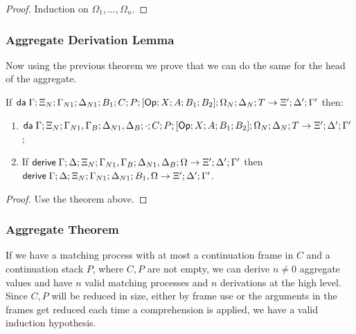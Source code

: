 \begin{proof}
   Induction on $\Omega_1, ..., \Omega_n$.
\end{proof}

\subsubsection{Aggregate Derivation Lemma}

Now using the previous theorem we prove that we can do the same for the head of the aggregate.

\begin{theorem}
   If $\mathsf{da} \; \Gamma; \Xi_N; \Gamma_{N1}; \Delta_{N1}; B_1; C; P; [\mathsf{Op} ; X ; A ; B_1; B_2]; \Omega_N; \Delta_N; T \rightarrow \Xi'; \Delta'; \Gamma'$ then:
   
   \begin{enumerate}
      \item $\mathsf{da} \; \Gamma; \Xi_N; \Gamma_{N1}, \Gamma_B; \Delta_{N1}, \Delta_B; \cdot; C; P; [\mathsf{Op} ; X ; A ; B_1; B_2]; \Omega_N; \Delta_N; T \rightarrow \Xi'; \Delta'; \Gamma'$;
      \item If $\mathsf{derive} \; \Gamma; \Delta; \Xi_N; \Gamma_{N1}, \Gamma_B; \Delta_{N1}, \Delta_B; \Omega \rightarrow \Xi'; \Delta'; \Gamma'$ then $\mathsf{derive} \; \Gamma; \Delta; \Xi_N; \Gamma_{N1}; \Delta_{N1}; B_1, \Omega \rightarrow \Xi'; \Delta'; \Gamma'$.
   \end{enumerate}
\end{theorem}

\begin{proof}
   Use the theorem above.
\end{proof}

\subsubsection{Aggregate Theorem}

If we have a matching process with at most a continuation frame in $C$ and a continuation stack $P$, where $C, P$ are not empty, we can derive $n \neq 0$ aggregate values and have $n$ valid matching processes and $n$ derivations at the high level. Since $C, P$ will be reduced in size, either by frame use or the arguments in the frames get reduced each time a comprehension is applied, we have a valid induction hypothesis.

